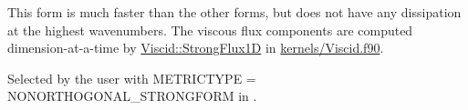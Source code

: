 This form is much faster than the other forms, but does not have any dissipation at the highest wavenumbers. The viscous flux components are computed dimension-\/at-\/a-\/time by \hyperlink{namespaceviscid_aa370fc5ec33429588facc68ee01d8435}{Viscid\+:\+:Strong\+Flux1D} in \hyperlink{Viscid_8f90}{kernels/\+Viscid.\+f90}.

Selected by the user with {\ttfamily M\+E\+T\+R\+I\+C\+T\+Y\+PE = N\+O\+N\+O\+R\+T\+H\+O\+G\+O\+N\+A\+L\+\_\+\+S\+T\+R\+O\+N\+G\+F\+O\+RM} in . 